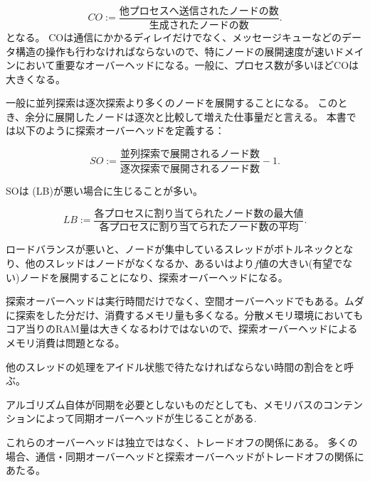 \begin{equation}
	CO := \frac{\text{他プロセスへ送信されたノードの数}}{\text{生成されたノードの数}}.
\end{equation}
となる。
COは通信にかかるディレイだけでなく、メッセージキューなどのデータ構造の操作も行わなければならないので、特にノードの展開速度が速いドメインにおいて重要なオーバーヘッドになる。一般に、プロセス数が多いほどCOは大きくなる。


一般に並列探索は逐次探索より多くのノードを展開することになる。
このとき、余分に展開したノードは逐次と比較して増えた仕事量だと言える。
本書では以下のように探索オーバーヘッドを定義する：

\begin{equation}
  SO := \frac{\text{並列探索で展開されるノード数}}{\text{逐次探索で展開されるノード数}} - 1.
\end{equation}

SOは (LB)が悪い場合に生じることが多い。

\begin{equation}
LB := \frac{\text{各プロセスに割り当てられたノード数の最大値}}{\text{各プロセスに割り当てられたノード数の平均}}.
\end{equation}

ロードバランスが悪いと、ノードが集中しているスレッドがボトルネックとなり、他のスレッドはノードがなくなるか、あるいはより$f$値の大きい(有望でない)ノードを展開することになり、探索オーバーヘッドになる。

探索オーバーヘッドは実行時間だけでなく、空間オーバーヘッドでもある。ムダに探索をした分だけ、消費するメモリ量も多くなる。分散メモリ環境においてもコア当りのRAM量は大きくなるわけではないので、探索オーバーヘッドによるメモリ消費は問題となる。

 {
  他のスレッドの処理をアイドル状態で待たなければならない時間の割合をと呼ぶ。
}

アルゴリズム自体が同期を必要としないものだとしても、メモリバスのコンテンションによって同期オーバーヘッドが生じることがある\cite{burnslrz10,kishimotofb13}.


これらのオーバーヘッドは独立ではなく、トレードオフの関係にある。
多くの場合、通信・同期オーバーヘッドと探索オーバーヘッドがトレードオフの関係にあたる。


